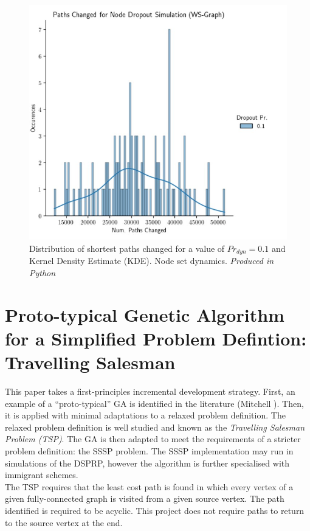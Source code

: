 \documentclass[
	a4paper, %
	10pt, %
	unnumberedsections, %
	twoside, %
]{LTJournalArticle}
\begin{document}
\begin{figure}[H]
	\includegraphics[width=\linewidth]{Figures/nsd/paths_dist.jpg}
	\caption{Distribution of shortest paths changed for a value of \(Pr_{dyn} = 0.1\) and Kernel Density Estimate (KDE). Node set dynamics. \emph{Produced in Python}}
	\label{fig:nsd_dist}
\end{figure}

\section{Proto-typical Genetic Algorithm for a Simplified Problem Defintion: Travelling Salesman} 

This paper takes a first-principles incremental development strategy. First, an example of a ``proto-typical'' GA is identified in the literature (Mitchell \cite{mitchell:97}). Then, it is applied with minimal adaptations to a relaxed problem definition. The relaxed problem definition is well studied and known as the \emph{Travelling Salesman Problem (TSP)}. The GA is then adapted to meet the requirements of a stricter problem definition: the SSSP problem. The SSSP implementation may run in simulations of the DSPRP, however the algorithm is further specialised with immigrant schemes.  \\

The TSP requires that the least cost path is found in which every vertex of a given fully-connected graph is visited from a given source vertex. The path identified is required to be acyclic. This project does not require paths to return to the source vertex at the end. \\
\end{document}
